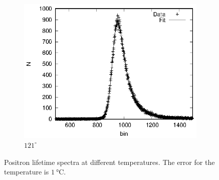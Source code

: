 \begin{figure}
\begin{subfigure}[h]{0.49\textwidth}
    \includegraphics[width=\textwidth]{evaluation_kilian/temp/na_121.eps}
    \caption{$121^\circ$}
  \end{subfigure}
  \caption{Positron lifetime spectra at different temperatures. The error for the temperature is $\SI{1}{\celsius}$.}
  \label{fig:lifetime_spectra}
\end{figure} 

